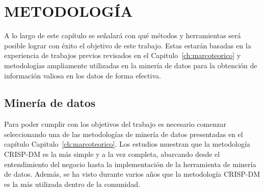 \chapter{METODOLOGÍA}
\label{ch:metodologia}

A lo largo de este capítulo se señalará con qué métodos y herramientas será posible lograr con éxito el objetivo de este trabajo. Estas estarán basadas en la experiencia de trabajos previos revisados en el Capitulo~\ref{ch:marcoteorico} y metodologías ampliamente utilizadas en la minería de datos para la obtención de información valiosa en los datos de forma efectiva.

\section{Minería de datos}

Para poder cumplir con los objetivos del trabajo es necesario comenzar seleccionando una de las metodologías de minería de datos presentadas en el capítulo Capitulo~\ref{ch:marcoteorico}. Los estudios muestran que la metodología CRISP-DM es la más simple y a la vez completa, abarcando desde el entendimiento del negocio hasta la implementación de la herramienta de minería de datos.\cite{shafique2014comparative}
Además, se ha visto durante varios años que la metodología CRISP-DM es la más utilizada dentro de la comunidad.\cite{kdnuggets2014}

